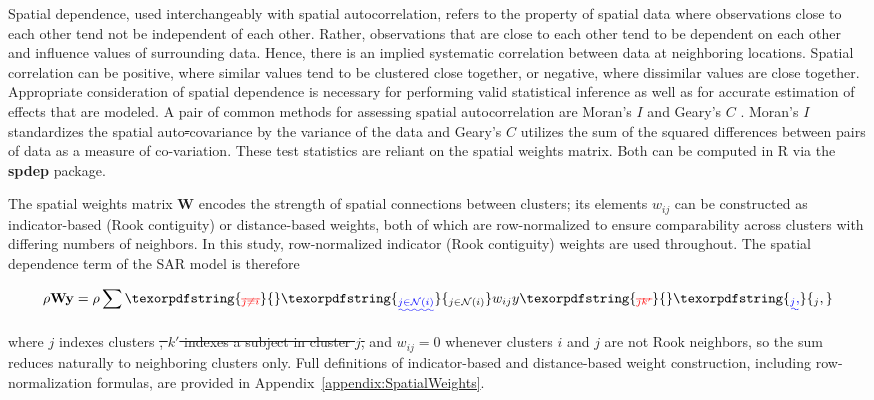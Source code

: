 \documentclass{article}[11pt]
\makeatletter
\providecommand{\DIFaddtex}[1]{{\protect\color{blue}\uwave{#1}}} %
\providecommand{\DIFdeltex}[1]{{\protect\color{red}\sout{#1}}} %
\providecommand{\DIFaddbegin}{} %
\providecommand{\DIFaddend}{} %
\providecommand{\DIFdelbegin}{} %
\providecommand{\DIFdelend}{} %
\providecommand{\DIFadd}[1]{\texorpdfstring{\DIFaddtex{#1}}{#1}} %
\providecommand{\DIFdel}[1]{\texorpdfstring{\DIFdeltex{#1}}{}} %
\providecommand{\DIFscaledelfig}{0.5}
\newlength{\DIFdelgraphicswidth} %
\newlength{\DIFdelgraphicsheight} %
\providecommand{\DIFaddincludegraphics}[2][]{{\color{blue}\fbox{\DIFOincludegraphics[#1]{#2}}}} %
\providecommand{\DIFdelincludegraphics}[2][]{%
\sbox{\DIFdelgraphicsbox}{\DIFOincludegraphics[#1]{#2}}%
\settoboxwidth{\DIFdelgraphicswidth}{\DIFdelgraphicsbox} %
\settoboxtotalheight{\DIFdelgraphicsheight}{\DIFdelgraphicsbox} %
\scalebox{\DIFscaledelfig}{%
\parbox[b]{\DIFdelgraphicswidth}{\usebox{\DIFdelgraphicsbox}\\[-\baselineskip] \rule{\DIFdelgraphicswidth}{0em}}\llap{\resizebox{\DIFdelgraphicswidth}{\DIFdelgraphicsheight}{%
\setlength{\unitlength}{\DIFdelgraphicswidth}%
\begin{picture}(1,1)%
\thicklines\linethickness{2pt} %
{\color[rgb]{1,0,0}\put(0,0){\framebox(1,1){}}}%
{\color[rgb]{1,0,0}\put(0,0){\line( 1,1){1}}}%
{\color[rgb]{1,0,0}\put(0,1){\line(1,-1){1}}}%
\end{picture}%
}\hspace*{3pt}}} %
} %
\DeclareRobustCommand{\DIFaddbegin}{\DIFOaddbegin \let\includegraphics\DIFaddincludegraphics} %
\DeclareRobustCommand{\DIFaddend}{\DIFOaddend \let\includegraphics\DIFOincludegraphics} %
\DeclareRobustCommand{\DIFdelbegin}{\DIFOdelbegin \let\includegraphics\DIFdelincludegraphics} %
\DeclareRobustCommand{\DIFdelend}{\DIFOaddend \let\includegraphics\DIFOincludegraphics} %
\let\sout@orig\sout %
\renewcommand{\sout}[1]{\ifmmode\text{\sout@orig{\ensuremath{#1}}}\else\sout@orig{#1}\fi} %
\makeatother
\begin{document}
Spatial dependence, used interchangeably with spatial autocorrelation, refers to the property of spatial data where observations close to each other tend not \DIFaddbegin \DIFadd{to }\DIFaddend be independent of each other. Rather, observations that are close to each other tend to be dependent on each other and influence values of surrounding data. Hence, there is an implied systematic correlation between data at neighboring locations. Spatial correlation can be positive, where similar values tend to be clustered close together, or negative, where dissimilar values are close together. Appropriate consideration of spatial dependence is necessary for performing valid statistical inference as well as for accurate estimation of effects that are modeled. A pair of common methods for assessing spatial autocorrelation are Moran's $\textit{I}$ \cite{moran_interpretation_1948}\cite{moran_notes_1950} and Geary's $\textit{C}$ \cite{geary_contiguity_1954}\cite{waller_applied_2004}. Moran's $\textit{I}$ standardizes the spatial auto\DIFdelbegin \DIFdel{-}\DIFdelend covariance by the variance of the data and Geary's $\textit{C}$ utilizes the sum of the squared differences between pairs of data as a measure of co-variation. These test statistics are reliant on the spatial weights matrix. Both can be computed in R via the \textbf{spdep} package\cite{bivand_comparing_2018}.


The spatial weights matrix $\mathbf{W}$ encodes the strength of spatial connections between clusters; its elements $w_{ij}$ can be constructed as indicator-based (Rook contiguity) or distance-based weights, both of which are row-normalized to ensure comparability across clusters with differing numbers of neighbors. In this study, row-normalized indicator (Rook contiguity) weights are used throughout. The spatial dependence term of the SAR model is therefore

\begin{equation}\label{Equation:SpatialDepTerm}
    \rho\mathbf{Wy} = \rho\sum\DIFdelbegin \DIFdel{_{j \neq i}}\DIFdelend \DIFaddbegin \DIFadd{_{j \in \mathcal{N}(i)}}\DIFaddend w_{ij}y\DIFdelbegin \DIFdel{_{jk'}
}\DIFdelend \DIFaddbegin \DIFadd{_j,
}\DIFaddend \end{equation}
\DIFdelbegin %

\DIFdelend \DIFaddbegin \noindent \DIFaddend where $j$ indexes clusters \DIFdelbegin \DIFdel{, $k'$ indexes a subject in cluster $j$, }\DIFdelend and $w_{ij} = 0$ whenever clusters $i$ and $j$ are not Rook neighbors, so the sum reduces naturally to neighboring clusters only. Full definitions of indicator-based and distance-based weight construction, including row-normalization formulas, are provided in Appendix~\ref{appendix:SpatialWeights}.
\end{document}
